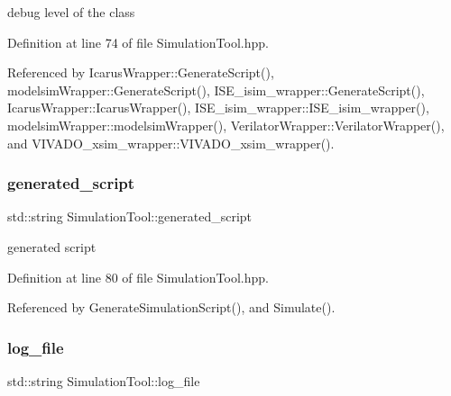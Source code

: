 debug level of the class 



Definition at line 74 of file Simulation\+Tool.\+hpp.



Referenced by Icarus\+Wrapper\+::\+Generate\+Script(), modelsim\+Wrapper\+::\+Generate\+Script(), I\+S\+E\+\_\+isim\+\_\+wrapper\+::\+Generate\+Script(), Icarus\+Wrapper\+::\+Icarus\+Wrapper(), I\+S\+E\+\_\+isim\+\_\+wrapper\+::\+I\+S\+E\+\_\+isim\+\_\+wrapper(), modelsim\+Wrapper\+::modelsim\+Wrapper(), Verilator\+Wrapper\+::\+Verilator\+Wrapper(), and V\+I\+V\+A\+D\+O\+\_\+xsim\+\_\+wrapper\+::\+V\+I\+V\+A\+D\+O\+\_\+xsim\+\_\+wrapper().

\mbox{\label{classSimulationTool_a8ddd42da76722ed7095fbcbb11f46af7}} 
\subsubsection{\texorpdfstring{generated\+\_\+script}{generated\_script}}
{\footnotesize\ttfamily std\+::string Simulation\+Tool\+::generated\+\_\+script\hspace{0.3cm}{\ttfamily [protected]}}



generated script 



Definition at line 80 of file Simulation\+Tool.\+hpp.



Referenced by Generate\+Simulation\+Script(), and Simulate().

\mbox{\label{classSimulationTool_aa927c5fdab04311517034cbec7a9a5c2}} 
\subsubsection{\texorpdfstring{log\+\_\+file}{log\_file}}
{\footnotesize\ttfamily std\+::string Simulation\+Tool\+::log\+\_\+file\hspace{0.3cm}{\ttfamily [protected]}}



